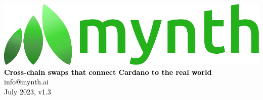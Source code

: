 \documentclass{article}
\begin{document}
\begin{sloppypar}

\begin{titlepage}
\sffamily\selectfont
\centering
\vspace*{7cm}
{\includegraphics[width=15cm]{
mynth-logo.pdf}}\\[5\baselineskip]
\textcolor{black}{
{\Large \textbf{Cross-chain swaps that connect Cardano to the real world}}\\[2\baselineskip]
{\large info@mynth.ai}\\[3\baselineskip]
{\large July 2023, v1.3}
}
\end{titlepage}

\tableofcontents



\end{sloppypar}
\end{document}
